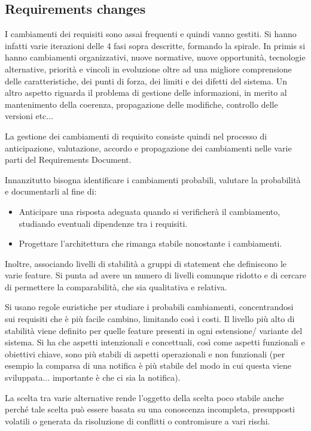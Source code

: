 \subsection{Requirements changes}
I cambiamenti dei requisiti sono assai frequenti e quindi vanno gestiti. Si hanno
infatti varie iterazioni delle 4 fasi sopra descritte, formando la spirale.
In primis si hanno cambiamenti organizzativi, nuove normative, nuove opportunità,
tecnologie alternative, priorità e vincoli in evoluzione oltre ad una migliore
comprensione delle caratteristiche, dei punti di forza, dei limiti e dei difetti
del sistema. Un altro aspetto riguarda il problema di gestione delle informazioni,
in merito al mantenimento della coerenza, propagazione delle modifiche, controllo
delle versioni etc$\dots$

La gestione dei cambiamenti di requisito consiste quindi nel processo di anticipazione,
valutazione, accordo e propagazione dei cambiamenti nelle varie parti del
Requirements Document.

Innanzitutto bisogna identificare i cambiamenti probabili, valutare la probabilità
e documentarli al fine di:
\begin{itemize}
    \item Anticipare una risposta adeguata quando si verificherà il cambiamento,
          studiando eventuali dipendenze tra i requisiti.
    \item Progettare l'architettura che rimanga stabile nonostante i cambiamenti.
\end{itemize}
Inoltre, associando livelli di stabilità a gruppi di statement che definiscono le
varie feature. Si punta ad avere un numero di livelli comunque ridotto e di cercare
di permettere la comparabilità, che sia qualitativa e relativa.

Si usano regole euristiche per studiare i probabili cambiamenti, concentrandosi
sui requisiti che è più facile cambino, limitando così i costi. Il livello più
alto di stabilità viene definito per quelle feature presenti in ogni estensione/
variante del sistema. Si ha che aspetti intenzionali e concettuali, così come aspetti
funzionali e obiettivi chiave, sono più stabili di aspetti operazionali e non
funzionali (per esempio la comparsa di una notifica è più stabile del modo in cui
questa viene sviluppata$\dots$ importante è che ci sia la notifica).

La scelta tra varie alternative rende l'oggetto della scelta poco stabile anche
perché tale scelta può essere basata su una conoscenza incompleta, presupposti
volatili o generata da risoluzione di conflitti o contromisure a vari rischi.

